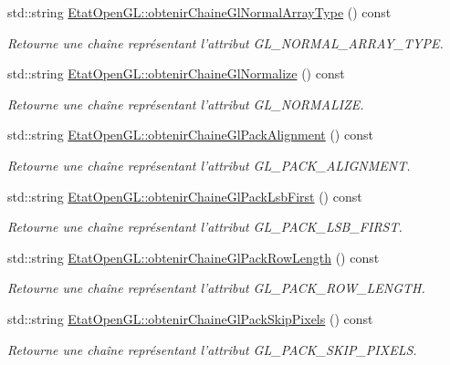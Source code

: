 \begin{DoxyCompactItemize}
std\-::string \hyperlink{group__utilitaire_gac2ac905eb6421d2ff8edb736557f40e5}{Etat\-Open\-G\-L\-::obtenir\-Chaine\-Gl\-Normal\-Array\-Type} () const 
\begin{DoxyCompactList}\small\item\em Retourne une chaîne représentant l'attribut G\-L\-\_\-\-N\-O\-R\-M\-A\-L\-\_\-\-A\-R\-R\-A\-Y\-\_\-\-T\-Y\-P\-E. \end{DoxyCompactList}\item 
std\-::string \hyperlink{group__utilitaire_gab8f8c7f8e749817f94751308b2344af4}{Etat\-Open\-G\-L\-::obtenir\-Chaine\-Gl\-Normalize} () const 
\begin{DoxyCompactList}\small\item\em Retourne une chaîne représentant l'attribut G\-L\-\_\-\-N\-O\-R\-M\-A\-L\-I\-Z\-E. \end{DoxyCompactList}\item 
std\-::string \hyperlink{group__utilitaire_ga7b46757dfa6068f0833baab8d98d2c2a}{Etat\-Open\-G\-L\-::obtenir\-Chaine\-Gl\-Pack\-Alignment} () const 
\begin{DoxyCompactList}\small\item\em Retourne une chaîne représentant l'attribut G\-L\-\_\-\-P\-A\-C\-K\-\_\-\-A\-L\-I\-G\-N\-M\-E\-N\-T. \end{DoxyCompactList}\item 
std\-::string \hyperlink{group__utilitaire_ga49cc9b47a26f144e0651b4679752a02c}{Etat\-Open\-G\-L\-::obtenir\-Chaine\-Gl\-Pack\-Lsb\-First} () const 
\begin{DoxyCompactList}\small\item\em Retourne une chaîne représentant l'attribut G\-L\-\_\-\-P\-A\-C\-K\-\_\-\-L\-S\-B\-\_\-\-F\-I\-R\-S\-T. \end{DoxyCompactList}\item 
std\-::string \hyperlink{group__utilitaire_ga64b0337d0f84557f6f8661ec6e03e154}{Etat\-Open\-G\-L\-::obtenir\-Chaine\-Gl\-Pack\-Row\-Length} () const 
\begin{DoxyCompactList}\small\item\em Retourne une chaîne représentant l'attribut G\-L\-\_\-\-P\-A\-C\-K\-\_\-\-R\-O\-W\-\_\-\-L\-E\-N\-G\-T\-H. \end{DoxyCompactList}\item 
std\-::string \hyperlink{group__utilitaire_gadb44f6347d29047a0a3789c51f4913f6}{Etat\-Open\-G\-L\-::obtenir\-Chaine\-Gl\-Pack\-Skip\-Pixels} () const 
\begin{DoxyCompactList}\small\item\em Retourne une chaîne représentant l'attribut G\-L\-\_\-\-P\-A\-C\-K\-\_\-\-S\-K\-I\-P\-\_\-\-P\-I\-X\-E\-L\-S. \end{DoxyCompactList}\item 

\end{DoxyCompactItemize}
